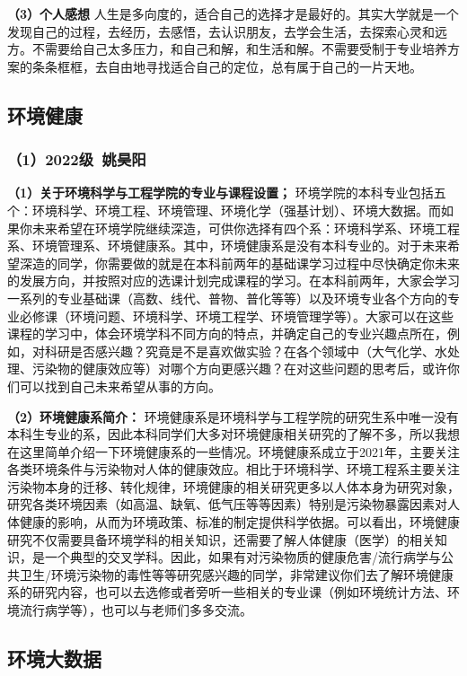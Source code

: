 \documentclass[11pt,oneside]{book}
\begin{document}
\textbf{（3）个人感想}
人生是多向度的，适合自己的选择才是最好的。其实大学就是一个发现自己的过程，去经历，去感悟，去认识朋友，去学会生活，去探索心灵和远方。不需要给自己太多压力，和自己和解，和生活和解。不需要受制于专业培养方案的条条框框，去自由地寻找适合自己的定位，总有属于自己的一片天地。

\subsection{环境健康}

\subsubsection{（1）2022级\ 姚昊阳}

\textbf{（1）关于环境科学与工程学院的专业与课程设置；}
环境学院的本科专业包括五个：环境科学、环境工程、环境管理、环境化学（强基计划）、环境大数据。而如果你未来希望在环境学院继续深造，可供你选择有四个系：环境科学系、环境工程系、环境管理系、环境健康系。其中，环境健康系是没有本科专业的。对于未来希望深造的同学，你需要做的就是在本科前两年的基础课学习过程中尽快确定你未来的发展方向，并按照对应的选课计划完成课程的学习。在本科前两年，大家会学习一系列的专业基础课（高数、线代、普物、普化等等）以及环境专业各个方向的专业必修课（环境问题、环境科学、环境工程学、环境管理学等）。大家可以在这些课程的学习中，体会环境学科不同方向的特点，并确定自己的专业兴趣点所在，例如，对科研是否感兴趣？究竟是不是喜欢做实验？在各个领域中（大气化学、水处理、污染物的健康效应等）对哪个方向更感兴趣？在对这些问题的思考后，或许你们可以找到自己未来希望从事的方向。

\textbf{（2）环境健康系简介：}
环境健康系是环境科学与工程学院的研究生系中唯一没有本科生专业的系，因此本科同学们大多对环境健康相关研究的了解不多，所以我想在这里简单介绍一下环境健康系的一些情况。环境健康系成立于2021年，主要关注各类环境条件与污染物对人体的健康效应。相比于环境科学、环境工程系主要关注污染物本身的迁移、转化规律，环境健康的相关研究更多以人体本身为研究对象，研究各类环境因素（如高温、缺氧、低气压等等因素）特别是污染物暴露因素对人体健康的影响，从而为环境政策、标准的制定提供科学依据。可以看出，环境健康研究不仅需要具备环境学科的相关知识，还需要了解人体健康（医学）的相关知识，是一个典型的交叉学科。因此，如果有对污染物质的健康危害/流行病学与公共卫生/环境污染物的毒性等等研究感兴趣的同学，非常建议你们去了解环境健康系的研究内容，也可以去选修或者旁听一些相关的专业课（例如环境统计方法、环境流行病学等），也可以与老师们多多交流。

\subsection{环境大数据}
\end{document}
